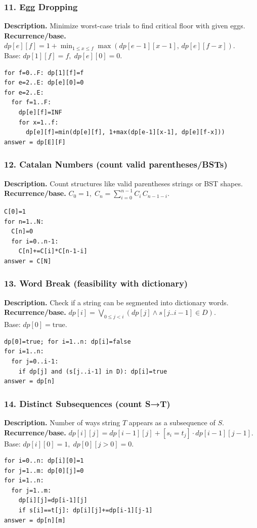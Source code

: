 \documentclass[9pt]{extarticle}
\begin{document}
\subsubsection{11. Egg Dropping}
\textbf{Description.} Minimize worst-case trials to find critical floor with given eggs.\\
\textbf{Recurrence/base.} \(dp[e][f]=1+\min_{1\le x\le f}\max(dp[e-1][x-1],\,dp[e][f-x])\).\\  
Base: \(dp[1][f]=f,\;dp[e][0]=0\).
\begin{verbatim}
for f=0..F: dp[1][f]=f
for e=2..E: dp[e][0]=0
for e=2..E:
  for f=1..F:
    dp[e][f]=INF
    for x=1..f:
      dp[e][f]=min(dp[e][f], 1+max(dp[e-1][x-1], dp[e][f-x]))
answer = dp[E][F]
\end{verbatim}

\subsubsection{12. Catalan Numbers (count valid parentheses/BSTs)}
\textbf{Description.} Count structures like valid parentheses strings or BST shapes.\\
\textbf{Recurrence/base.} \(C_0=1,\; C_n=\sum_{i=0}^{n-1} C_i\,C_{n-1-i}\).\\
\begin{verbatim}
C[0]=1
for n=1..N:
  C[n]=0
  for i=0..n-1:
    C[n]+=C[i]*C[n-1-i]
answer = C[N]
\end{verbatim}

\subsubsection{13. Word Break (feasibility with dictionary)}
\textbf{Description.} Check if a string can be segmented into dictionary words.\\
\textbf{Recurrence/base.} \(dp[i]=\bigvee_{0\le j<i}(dp[j]\land s[j..i-1]\in D)\).\\  
Base: \(dp[0]=\text{true}\).
\begin{verbatim}
dp[0]=true; for i=1..n: dp[i]=false
for i=1..n:
  for j=0..i-1:
    if dp[j] and (s[j..i-1] in D): dp[i]=true
answer = dp[n]
\end{verbatim}

\subsubsection{14. Distinct Subsequences (count S→T)}
\textbf{Description.} Number of ways string \(T\) appears as a subsequence of \(S\).\\
\textbf{Recurrence/base.} \(dp[i][j]=dp[i-1][j]+[s_i=t_j]\cdot dp[i-1][j-1]\).  \\
Base: \(dp[i][0]=1,\; dp[0][j>0]=0\).
\begin{verbatim}
for i=0..n: dp[i][0]=1
for j=1..m: dp[0][j]=0
for i=1..n:
  for j=1..m:
    dp[i][j]=dp[i-1][j]
    if s[i]==t[j]: dp[i][j]+=dp[i-1][j-1]
answer = dp[n][m]
\end{verbatim}
\end{document}
